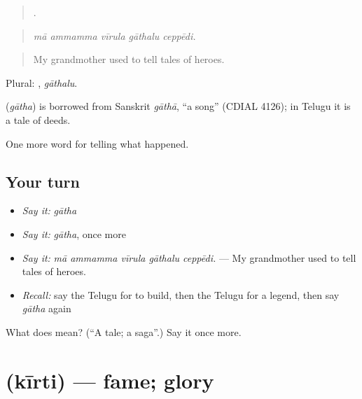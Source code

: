 \begin{quote}
    .
\end{quote}

\begin{quote}
\emph{mā ammamma vīrula gāthalu ceppēdi.}
\end{quote}

\begin{quote}
My grandmother used to tell tales of heroes.
\end{quote}

Plural: , \emph{gāthalu}.

\begin{cousinweb}
\textbf{} (\emph{gātha}) is borrowed from Sanskrit \emph{gāthā}, \textquotedblleft{}a song\textquotedblright{} (CDIAL 4126); in Telugu it is a tale of deeds.
\end{cousinweb}

\begin{grammarlens}[title={What you've built}]
One more word for telling what happened.
\end{grammarlens}

\subsection*{Your turn}
\begin{itemize}
\raggedright
  \item \emph{Say it:} \emph{gātha}
  \item \emph{Say it:} \emph{gātha}, once more
  \item \emph{Say it:} \emph{mā ammamma vīrula gāthalu ceppēdi.} — My grandmother used to tell tales of heroes.
  \item \emph{Recall:} say the Telugu for to build, then the Telugu for a legend, then say \emph{gātha} again
\end{itemize}

\begin{tcolorbox}[breakable,colback=teal!4,colframe=teal!35!black,title={Before you move on}]
What does  mean? (\textquotedblleft{}A tale; a saga\textquotedblright{}.) Say it once more.
\end{tcolorbox}
\section[\texorpdfstring{\te{కీర్తి} (kīrti)}{కీర్తి (kīrti)}]{ (kīrti) — fame; glory}

